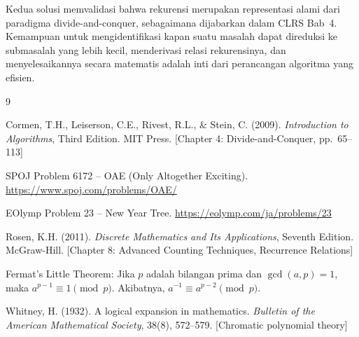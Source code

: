 \documentclass[12pt,a4paper]{article}
\theoremstyle{definition}
\begin{document}
Kedua solusi memvalidasi bahwa rekurensi merupakan representasi alami dari
paradigma divide-and-conquer, sebagaimana dijabarkan dalam CLRS Bab~4. Kemampuan
untuk mengidentifikasi kapan suatu masalah dapat direduksi ke submasalah yang
lebih kecil, menderivasi relasi rekurensinya, dan menyelesaikannya secara
matematis adalah inti dari perancangan algoritma yang efisien.

\begin{thebibliography}{9}

  Cormen, T.H., Leiserson, C.E., Rivest, R.L., \& Stein, C. (2009).
  \emph{Introduction to Algorithms}, Third Edition.
  MIT Press. [Chapter 4: Divide-and-Conquer, pp.~65--113]

  SPOJ Problem 6172 -- OAE (Only Altogether Exciting).
  \url{https://www.spoj.com/problems/OAE/}

  EOlymp Problem 23 -- New Year Tree.
  \url{https://eolymp.com/ja/problems/23}

  Rosen, K.H. (2011).
  \emph{Discrete Mathematics and Its Applications}, Seventh Edition.
  McGraw-Hill. [Chapter 8: Advanced Counting Techniques, Recurrence Relations]

  Fermat's Little Theorem: Jika $p$ adalah bilangan prima dan $\gcd(a,p)=1$, maka
  $a^{p-1}\equiv 1\pmod{p}$. Akibatnya, $a^{-1}\equiv a^{p-2}\pmod{p}$.

  Whitney, H. (1932). A logical expansion in mathematics.
  \emph{Bulletin of the American Mathematical Society}, 38(8), 572--579.
  [Chromatic polynomial theory]

\end{thebibliography}
\end{document}
